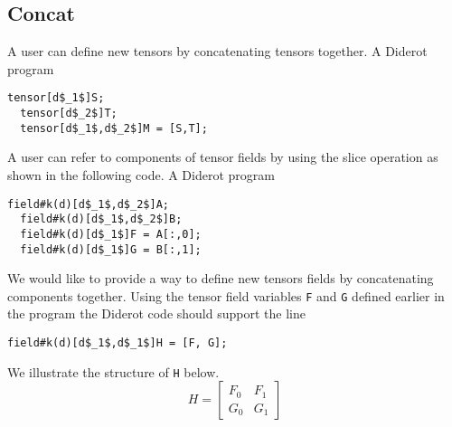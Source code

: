 
  \subsection{Concat}
A user can define new tensors by concatenating tensors together.
A Diderot program
\begin{lstlisting}[mathescape=true]
  tensor[d$_1$]S; 
  tensor[d$_2$]T;
  tensor[d$_1$,d$_2$]M = [S,T]; 
\end{lstlisting}

A user can refer to components of tensor fields by using the slice operation as shown in the following code.
A Diderot program
\begin{lstlisting}[mathescape=true]
  field#k(d)[d$_1$,d$_2$]A; 
  field#k(d)[d$_1$,d$_2$]B;
  field#k(d)[d$_1$]F = A[:,0]; 
  field#k(d)[d$_1$]G = B[:,1];
\end{lstlisting}

We would like to provide a way to define new tensors fields by concatenating components together.
Using the tensor field variables \lstinline!F! and  \lstinline!G! defined earlier in the program the Diderot code should support the line 
\begin{lstlisting}[mathescape=true]
  field#k(d)[d$_1$,d$_1$]H = [F, G];
\end{lstlisting}

\noindent We illustrate the structure of \lstinline[mathescape=true]!H! below.  
\begin{displaymath}
  H=\left[ \begin{array}{ll}
  F_0  & F_1\\
  G_0  &G_1
  \end{array}
 \right]  
 \end{displaymath}
 
